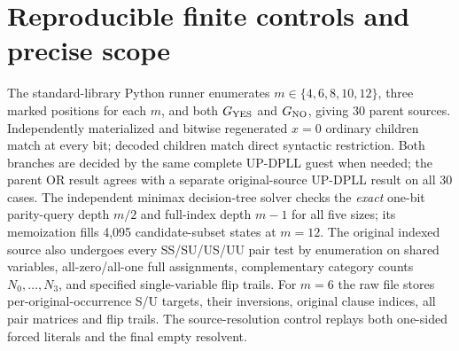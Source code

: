 \documentclass[10pt]{article}
\begin{document}
\section{Reproducible finite controls and precise scope}
The standard-library Python runner enumerates $m\in\{4,6,8,10,12\}$, three marked positions for each $m$, and both $G_{\rm YES}$ and $G_{\rm NO}$, giving 30 parent sources. Independently materialized and bitwise regenerated $x=0$ ordinary children match at every bit; decoded children match direct syntactic restriction. Both branches are decided by the same complete UP-DPLL guest when needed; the parent OR result agrees with a separate original-source UP-DPLL result on all 30 cases. The independent minimax decision-tree solver checks the \emph{exact} one-bit parity-query depth $m/2$ and full-index depth $m-1$ for all five sizes; its memoization fills 4,095 candidate-subset states at $m=12$. The original indexed source also undergoes every SS/SU/US/UU pair test by enumeration on shared variables, all-zero/all-one full assignments, complementary category counts $N_0,\ldots,N_3$, and specified single-variable flip trails. For $m=6$ the raw file stores per-original-occurrence S/U targets, their inversions, original clause indices, all pair matrices and flip trails. The source-resolution control replays both one-sided forced literals and the final empty resolvent.
\end{document}
